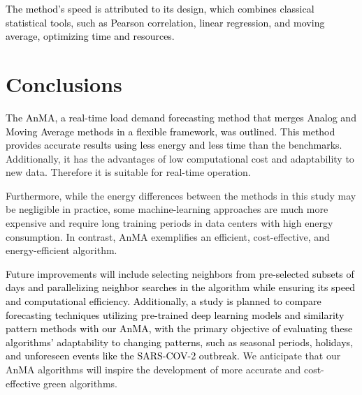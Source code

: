 \documentclass[journal, twoside]{IEEEtran}
\begin{document}
\textcolor{black}{The method's speed is attributed to its design, which combines classical statistical tools, such as Pearson correlation, linear regression, and moving average, optimizing time and resources.}










\section{Conclusions}
\label{sec:Conclusion}
\textcolor{black}{The \ac{AnMA}, a real-time load demand forecasting method that merges Analog and Moving Average methods in a flexible framework, was outlined. This method provides accurate results using less energy and less time than the benchmarks.}  Additionally, it has the advantages of low computational cost and adaptability to new data. Therefore it is suitable for real-time operation.

Furthermore, while the energy differences between the methods in this study may be negligible in practice, some machine-learning approaches are much more expensive and require long training periods in data centers with high energy consumption. In contrast, \ac{AnMA} exemplifies an efficient, cost-effective, and energy-efficient algorithm. %
      
 \textcolor{black}{Future improvements will include selecting neighbors from pre-selected subsets of days and parallelizing neighbor searches in the algorithm while ensuring its speed and computational efficiency. Additionally, a study is planned to compare forecasting techniques utilizing pre-trained deep learning models and similarity pattern methods with our AnMA, with the primary objective of evaluating these algorithms' adaptability to changing patterns, such as seasonal periods, holidays, and unforeseen events like the SARS-COV-2 outbreak.} We anticipate that our \ac{AnMA} algorithms will inspire the development of more accurate and cost-effective green algorithms.


      






\end{document}
